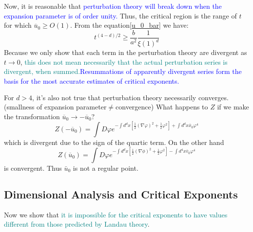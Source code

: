 \documentclass[12pt,titlepage]{article}
\newcommand{\bluep}[1]{\textcolor{blue}{#1}}
\newcommand{\tealp}[1]{\textcolor{teal}{#1}}
\numberwithin{equation}{section}
\begin{document}
Now, it is reasonable that \bluep{perturbation theory will break down when the expansion parameter is of order unity.} Thus, the critical region is the range of $t$ for which $\overline{u}_{0} \geq O(1)$. From the equation\ref{u_0_bar} we have:
\begin{equation}
t^{(4-d) / 2} \geq \frac{b}{a^{2}} \frac{1}{\xi(1)^{d}}
\end{equation}
Because we only show that each term in the perturbation theory are divergent as $t\rightarrow 0$, \tealp{this does not mean necessarily that the actual perturbation series is divergent, when summed.}\bluep{Resummations of apparently divergent series form the basis for the most accurate estimates of critical exponents.}

For $d>4$, it's also not true that perturbation theory necessarily converges.(smallness of expansion parameter$\neq$convergence) What happens to $Z$ if we make the transformation $\overline{u}_{0} \rightarrow-\overline{u}_{0} ?$
\begin{equation}
Z\left(-\overline{u}_{0}\right)=\int D \varphi e^{-\int d^{d} x\left[\frac{1}{2}(\nabla \varphi)^{2}+\frac{1}{2} \varphi^{2}\right]+\int d^{d} x \overline{x}_{0} \varphi^{4}}
\end{equation}
which is divergent due to the sign of the quartic term. On the other hand
\begin{equation}
Z\left(\overline{u}_{0}\right)=\int D \varphi e^{-\int d^{d} x\left[\frac{1}{2}(\nabla \phi)^{2}+\frac{1}{2} \varphi^{2}\right]-\int d^{4} x \overline{v}_{0} \varphi^{4}}
\end{equation}
is convergent. Thus $\bar u_0$ is not a regular point.
\subsection{Dimensional Analysis and Critical Exponents}
Now we show that \tealp{it is impossible for the critical exponents to have values different from those predicted by Landau theory}.
\end{document}
